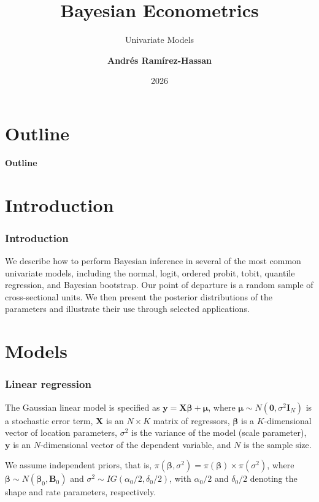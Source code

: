 \documentclass[12pt, compress]{beamer}
\title{Bayesian Econometrics}
\subtitle{Univariate Models}
\date{2026}
\author[Andr\'e Ram\'irez H.]{\textbf{Andr\'es Ram\'irez-Hassan}}
\institute[EAFIT]{\small{Universidad EAFIT\\School of Finance, Economics and Government}}
\begin{document}
	
	\maketitle
	
	
	
	
	\section*{Outline}
	\begin{frame}
		\textbf{\Large{Outline}}
		\tableofcontents
	\end{frame}
	
\section{Introduction}
	
\begin{frame}
	\frametitle{Introduction}
We describe how to perform Bayesian inference in several of the most common univariate models, including the normal, logit, ordered probit, tobit, quantile regression, and Bayesian bootstrap. Our point of departure is a random sample of cross-sectional units. We then present the posterior distributions of the parameters and illustrate their use through selected applications.
\end{frame}

\section{Models}
\begin{frame}
	\frametitle{Linear regression}
The Gaussian linear model is specified as ${\bm{y}} = {\bm{X}}\bm{\beta} + \bm{\mu}$, where $\bm{\mu} \sim N(\bm{0}, \sigma^2 \bm{I}_N)$ is a stochastic error term, ${\bm{X}}$ is an $N \times K$ matrix of regressors, $\bm{\beta}$ is a $K$-dimensional vector of location parameters, $\sigma^2$ is the variance of the model (scale parameter), ${\bm{y}}$ is an $N$-dimensional vector of the dependent variable, and $N$ is the sample size.

We assume independent priors, that is, $\pi(\bm{\beta}, \sigma^2) = \pi(\bm{\beta}) \times \pi(\sigma^2)$, where $\bm{\beta} \sim N(\bm{\beta}_0, {\bm{B}}_0)$ and $\sigma^2 \sim IG(\alpha_0/2, \delta_0/2)$, with $\alpha_0/2$ and $\delta_0/2$ denoting the shape and rate parameters, respectively.
\end{frame}
\end{document}
